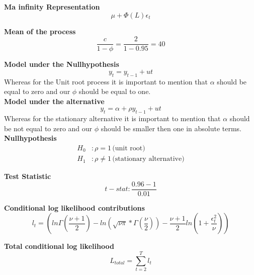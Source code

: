 \documentclass[12pt]{article}
\begin{document}
\textbf{Ma infinity Representation}
 \begin{equation}
    \mu + \Phi(L)\epsilon_t
    \label{eq:Mainf}
 \end{equation}

 \textbf{Mean of the process}
 \begin{equation}
\frac{c}{1-\phi} = \frac{2}{1-0.95} = 40
\label{eq:Mean}
\end{equation}

\textbf{Model under the Nullhypothesis}
\begin{equation}
    y_t = y_{t-1} + ut
    \label{eq:true}
\end{equation}
Whereas for the Unit root process it is important to mention that $\alpha$ should be equal to zero and our $\phi$ should be equal to one.\\

\textbf{Model under the alternative}
\begin{equation}
    y_t = \alpha + \rho y_{t-1} + ut
    \label{eq:alternative}
\end{equation}
Whereas for the stationary alternative it is important to mention that $\alpha$ should be not equal to zero and our $\phi$ should be smaller then one in absolute terms.\\

\textbf{Nullhypothesis}
\begin{equation}
\begin{aligned}
    H_0 &: \rho = 1 \, \text{(unit root)} \\
    H_1 &: \rho \neq 1 \, \text{(stationary alternative)}
\end{aligned}
\label{eq:dftest}
\end{equation}

\textbf{Test Statistic}
\begin{equation}
    t-stat: \frac{0.96-1}{0.01}
    \label{eq:dftstat2}
\end{equation}

\textbf{Conditional log likelihood contributions}
 \begin{equation}
      l_{t} =  (ln \Gamma(\frac{\nu +1}{2})- ln(\sqrt{\nu \pi} * \Gamma(\frac{\nu}{2})) - \frac{\nu+1}{2}ln(1+\frac{\epsilon_t^{2}}{\nu}))
      \label{eq:clc}
 \end{equation}

\textbf{Total conditional log likelihood}
\begin{equation}
    L_{total} = \sum_{t=2}^{T} l_t
    \label{eq:tcl}
\end{equation}
\end{document}
